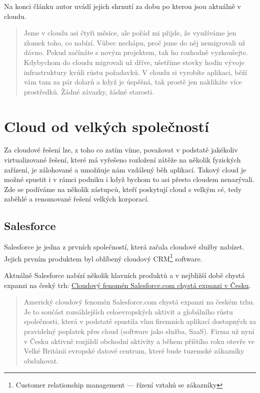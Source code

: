 Na konci článku autor uvádí jejich shrnutí za dobu po kterou jsou aktuálně v cloudu.
\begin{quote}
Jsme v cloudu asi čtyři měsíce, ale pořád mi přijde, že využíváme jen zlomek toho, co nabízí. Vůbec nechápu, proč jsme do něj nemigrovali už dávno. Pokud začínáte s novým projektem, tak ho rozhodně vyzkoušejte. Kdybychom do cloudu migrovali už dříve, ušetříme stovky hodin vývoje infrastruktury kvůli růstu požadavků. V cloudu si vyrobíte aplikaci, běží vám tam za pár dolarů a když je úspěšná, tak prostě jen naklikáte více prostředků. Žádné závazky, žádné starosti.\cite{souki:procMigrovat}
\end{quote}

\newpage
\section{Cloud od velkých společností}
Za cloudové řešení lze, z toho co zatím víme, považovat v podstatě jakékoliv virtualizované řešení, které má vyřešeno rozložení zátěže na několik fyzických zařízení, je zálohované a umožňuje nám vzdálený běh aplikací. Takový cloud je možné spustit i v rámci podniku i když bychom to asi přesto cloudem nenazývali. Zde se podíváme na několik zástupců, kteří poskytují cloud s velkým cé, tedy zaběhlé a renomované řešení velkých korporací.

\subsection{Salesforce}
Salesforce je jedna z prvních společností, která začala cloudové služby nabízet. Jejich prvním produktem byl oblíbený cloudový CRM\footnote{Customer relationship management --- řízení vztahů se zákazníky} software.

Aktuálně Salesforce nabízí několik hlavních produktů a v nejbližší době chystá expanzi na český trh: \href{http://connect.zive.cz/clanky/cloudovy-fenomen-salesforcecom-chysta-expanzi-v-cesku/sc-320-a-171592/default.aspx}{Cloudový fenomén Salesforce.com chystá expanzi v Česku\cite{zive:salesforceExpanze}}.

\begin{quote}
Americký cloudový fenomén Salesforce.com chystá expanzi na českém trhu. Je to součást rozsáhlejších celoevropských aktivit a globálního růstu společnosti, která v podstatě spustila vlnu firemních aplikací dostupných za pravidelný poplatek přes cloud (software jako služba, SaaS). Firma už nyní v Česku aktivně rozjíždí obchodní aktivity a během příštího roku otevře ve Velké Británii evropské datové centrum, které bude tuzemské zákazníky obsluhovat.\cite{zive:salesforceExpanze}
\end{quote}


